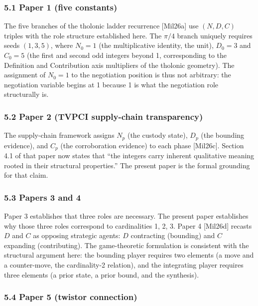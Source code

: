 \documentclass[
  11pt,
  letterpaper,
]{article}
\begin{document}
\subsubsection{5.1 Paper 1 (five
constants)}\label{paper-1-five-constants}

The five branches of the tholonic ladder recurrence {[}Mil26a{]} use
\((N, D, C)\) triples with the role structure established here. The
\(\pi/4\) branch uniquely requires seeds \((1, 3, 5)\), where
\(N_0 = 1\) (the multiplicative identity, the unit), \(D_0 = 3\) and
\(C_0 = 5\) (the first and second odd integers beyond 1, corresponding
to the Definition and Contribution axis multipliers of the tholonic
geometry). The assignment of \(N_0 = 1\) to the negotiation position is
thus not arbitrary: the negotiation variable begins at 1 because 1 is
what the negotiation role structurally is.

\subsubsection{5.2 Paper 2 (TVPCI supply-chain
transparency)}\label{paper-2-tvpci-supply-chain-transparency}

The supply-chain framework assigns \(N_p\) (the custody state), \(D_p\)
(the bounding evidence), and \(C_p\) (the corroboration evidence) to
each phase {[}Mil26c{]}. Section 4.1 of that paper now states that ``the
integers carry inherent qualitative meaning rooted in their structural
properties.'' The present paper is the formal grounding for that claim.

\subsubsection{5.3 Papers 3 and 4}\label{papers-3-and-4}

Paper 3 establishes that three roles are necessary. The present paper
establishes why those three roles correspond to cardinalities 1, 2, 3.
Paper 4 {[}Mil26d{]} recasts \(D\) and \(C\) as opposing strategic
agents: \(D\) contracting (bounding) and \(C\) expanding (contributing).
The game-theoretic formulation is consistent with the structural
argument here: the bounding player requires two elements (a move and a
counter-move, the cardinality-2 relation), and the integrating player
requires three elements (a prior state, a prior bound, and the
synthesis).

\subsubsection{5.4 Paper 5 (twistor
connection)}\label{paper-5-twistor-connection}
\end{document}
